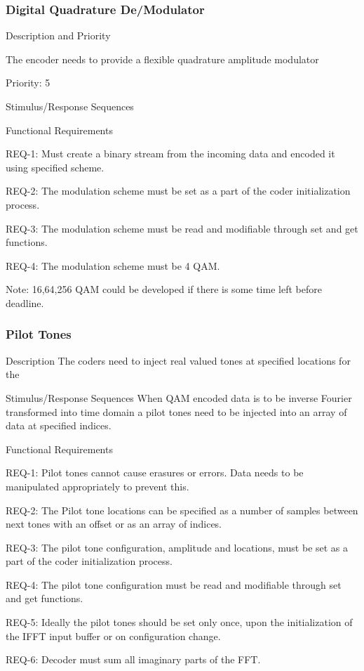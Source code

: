 \documentclass[]{report}
\begin{document}
\subsubsection{Digital Quadrature De/Modulator }

Description and Priority \par
The encoder needs to provide a flexible quadrature amplitude modulator \par
Priority: 5

Stimulus/Response Sequences \par 

Functional Requirements \par

REQ-1: Must create a binary stream from the incoming data and encoded it using specified scheme. \par
REQ-2: The modulation scheme must be set as a part of the coder initialization process. \par
REQ-3: The modulation scheme must be read and modifiable through set and get functions. \par
REQ-4: The modulation scheme must be 4 QAM. \par

Note: 16,64,256 QAM could be developed if there is some time left before deadline.

\subsubsection{Pilot Tones}

Description
The coders need to inject real valued tones at specified locations for the

Stimulus/Response Sequences
When QAM encoded data is to be inverse Fourier transformed into time domain a pilot tones need to be injected into an array of data at specified indices.

Functional Requirements \par

REQ-1: Pilot tones cannot cause erasures or errors. Data needs to be manipulated appropriately to prevent this. \par
REQ-2: The Pilot tone locations can be specified as a number of samples between next tones with an offset or as an array of indices. \par
REQ-3: The pilot tone configuration, amplitude and locations, must be set as a part of the coder initialization process. \par
REQ-4: The pilot tone configuration must be read and modifiable through set and get functions. \par
REQ-5: Ideally the pilot tones should be set only once, upon the initialization of the IFFT input buffer or on configuration change. \par
REQ-6: Decoder must sum all imaginary parts of the FFT. \par
\end{document}
